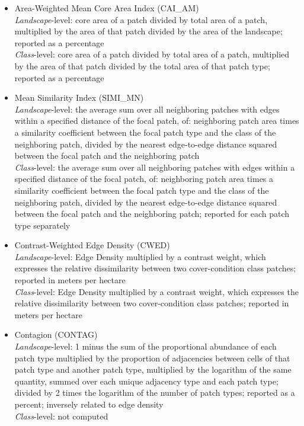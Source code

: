 \begin{itemize}
\begin{itemize}
		\item Area-Weighted Mean Core Area Index (CAI\_AM)\\
		\emph{Landscape}-level: core area of a patch divided by total area of a patch, multiplied by the area of that patch divided by the area of the landscape; reported as a percentage	\\
		\emph{Class}-level: core area of a patch divided by total area of a patch, multiplied by the area of that patch divided by the total area of that patch type; reported as a percentage	\\
		
		\item Mean Similarity Index (SIMI\_MN)\\
		\emph{Landscape}-level: the average sum over all neighboring patches with edges within a specified distance of the focal patch, of: neighboring patch area times a similarity coefficient between the focal patch type and the class of the neighboring patch, divided by the nearest edge-to-edge distance squared between the focal patch and the neighboring patch	\\
		\emph{Class}-level: the average sum over all neighboring patches with edges within a specified distance of the focal patch, of: neighboring patch area times a similarity coefficient between the focal patch type and the class of the neighboring patch, divided by the nearest edge-to-edge distance squared between the focal patch and the neighboring patch; reported for each patch type separately	\\
		
		\item Contrast-Weighted Edge Density (CWED)\\
		\emph{Landscape}-level: Edge Density multiplied by a contrast weight, which expresses the relative dissimilarity between two cover-condition class patches; reported in meters per hectare	\\
		\emph{Class}-level: Edge Density multiplied by a contrast weight, which expresses the relative dissimilarity between two cover-condition class patches; reported in meters per hectare\\

		\item Contagion (CONTAG)\\
		\emph{Landscape}-level: 1 minus the sum of the proportional abundance of each patch type multiplied by the proportion of adjacencies between cells of that patch type and another patch type, multiplied by the logarithm of the same quantity, summed over each unique adjacency type and each patch type; divided by 2 times the logarithm of the number of patch types; reported as a percent; inversely related to edge density\\
		\emph{Class}-level: not computed\ \ 	
		

\end{itemize}
\end{itemize}

